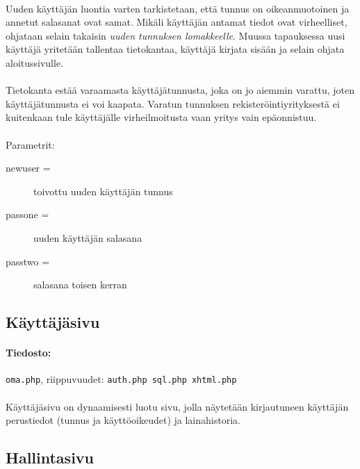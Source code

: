 \documentclass[11pt]{article}
\begin{document}
\paragraph{} Uuden käyttäjän luontia varten tarkistetaan, että tunnus on oikeanmuotoinen ja annetut salasanat ovat samat. Mikäli käyttäjän antamat tiedot ovat virheelliset, ohjataan selain takaisin \emph{uuden tunnuksen lomakkeelle}. Muussa tapauksessa uusi käyttäjä yritetään tallentaa tietokantaa, käyttäjä kirjata sisään ja selain ohjata aloitussivulle.

\paragraph{} Tietokanta estää varaamasta käyttäjätunnusta, joka on jo aiemmin varattu, joten käyttäjätunnusta ei voi kaapata. Varatun tunnuksen rekisteröintiyrityksestä ei kuitenkaan tule käyttäjälle virheilmoitusta vaan yritys vain epäonnistuu.

\paragraph{} Parametrit:
\begin{description}
\item[newuser =] toivottu uuden käyttäjän tunnus
\item[passone =] uuden käyttäjän salasana
\item[passtwo =] salasana toisen kerran
\end{description}


\subsection{Käyttäjäsivu}

\paragraph{Tiedosto:} \large{\texttt{oma.php}}, riippuvuudet: \texttt{auth.php sql.php xhtml.php}

\paragraph{} Käyttäjäsivu on dynaamisesti luotu sivu, jolla näytetään kirjautuneen käyttäjän perustiedot (tunnus ja käyttöoikeudet) ja lainahistoria.


\subsection{Hallintasivu}
\end{document}
